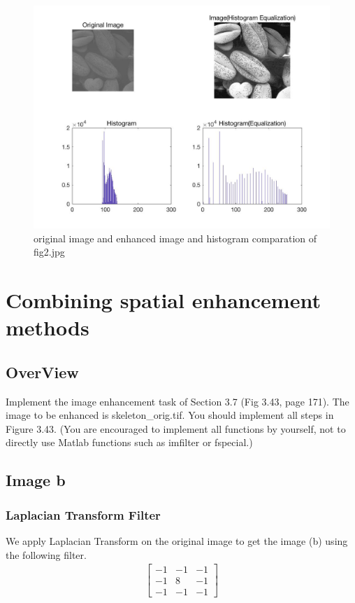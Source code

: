 \documentclass[11pt,oneside]{book}
\begin{document}
\begin{figure}[!htb]
   \centering  
   \includegraphics[width=1.0\textwidth]{images/1/image2.jpg}
   \caption{original image and enhanced image and histogram comparation of fig2.jpg}  
\end{figure}





\chapter{Combining spatial enhancement methods}
\section{OverView}
   Implement the image enhancement task of Section 3.7 (Fig 3.43, page 171). The image to be enhanced is skeleton\_orig.tif. You should implement all steps in Figure 3.43. (You are encouraged to implement all functions by yourself, not to directly use Matlab functions such as imfilter or fspecial.)

\section{Image b}
\subsection{Laplacian Transform Filter}
We apply Laplacian Transform on the original image to get the image (b) using the following filter.
\begin{gather*}
\begin{bmatrix} -1&-1&-1 \\ -1&8&-1 \\ -1&-1&-1\end{bmatrix}
\end{gather*}
\end{document}
